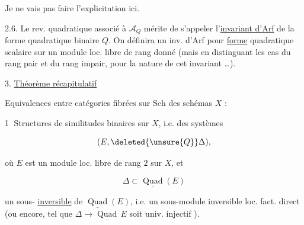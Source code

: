 
Je ne vais pas faire l'explicitation ici.

2.6. Le rev. quadratique  associé à $\mathcal A_Q$ mérite de s'appeler l'\uline{invariant d'Arf} de la forme quadratique binaire $Q$. On définira un inv. d'Arf pour \uline{ forme} quadratique scalaire sur un module loc. libre de rang donné (mais en distinguant les cas du rang pair et du rang impair, pour la nature de cet invariant \ldots).

3. \uline{Théorème récapitulatif}

Equivalences entre  catégories fibrées sur  $\mathrm{Sch}$ des schémas $X$ :

\textcircled{1} Structures de similitudes binaires  sur $X$, i.e. des systèmes

\[
(E,\deleted{\unsure{Q}}\Delta),
\]

où $E$ est un module loc. libre de rang $2$ sur $X$, et

\[
\Delta\subset\underline{\operatorname{Quad}}(E)
\]

un sous- \uline{inversible} de $\underline{\operatorname{Quad}}(E)$, i.e. un sous-module inversible  loc. fact. direct (ou encore, tel que $\Delta\longrightarrow\underline{\operatorname{Quad}}\,E$ soit univ. injectif \unsure{--}).
